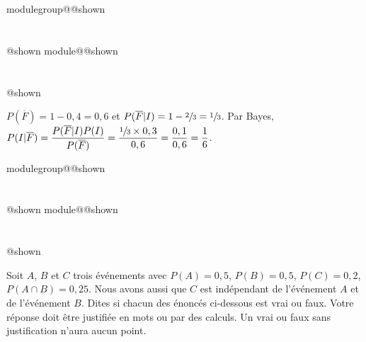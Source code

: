 \documentclass{Evaluation}
\makeatletter
\newcommand{\currentmodulekey}{}
\newcommand{\currentmoduletitle}{}
\newcommand{\currentgroupkey}{}
\newcommand{\currentgrouptitle}{}
\newcommand{\showmoduleifneeded}{%
  \ifx\currentgroupkey\empty\else
    \expandafter\ifx\csname modulegroup@\currentgroupkey @shown\endcsname\relax
      \section*{\currentgrouptitle}%
      \expandafter\gdef\csname modulegroup@\currentgroupkey @shown\endcsname{1}%
    \fi
  \fi
  \expandafter\ifx\csname module@\currentmodulekey @shown\endcsname\relax
    \section*{\currentmoduletitle}%
    \expandafter\gdef\csname module@\currentmodulekey @shown\endcsname{1}%
  \fi
}
\newenvironment{A23}{\showmoduleifneeded}{}
\newenvironment{A25}{\showmoduleifneeded}{}
\makeatother
\begin{document}
\begin{questions}
\begin{A25}
\begin{parts}
\begin{solution}
    $P(\overline{F})=1-0,4=0,6$ et $P(\overline{F}|I)=1-\sfrac{2}{3}=\sfrac{1}{3}$. Par Bayes, $P(I|\overline{F})=\dfrac{P(\overline{F}|I)P(I)}{P(\overline{F})}=\dfrac{\sfrac{1}{3}\times 0,3}{0,6}=\dfrac{0,1}{0,6}=\dfrac{1}{6}$.
\end{solution}
    \end{parts}
\end{A25}

\begin{A23}
\question {} %
Soit $A$, $B$ et $C$ trois événements avec $P(A)=0,5$, $P(B)=0,5$, $P(C)=0,2$, $P(A\cap B)=0,25$. Nous avons aussi que $C$ est indépendant de l'événement $A$ et de l'événement $B$. Dites si chacun des énoncés ci-dessous est vrai ou faux. Votre réponse doit être justifiée en mots ou par des calculs. Un vrai ou faux sans justification n'aura aucun point.

\end{A23}
\end{questions}
\end{document}
